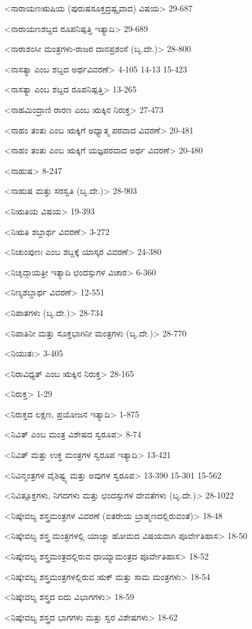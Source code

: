 <ನಾರಾಯಣಋಷಿಯ (ಪುರುಷಸೂಕ್ತದ್ರಷ್ಟೃವಾದ) ವಿಷಯ>
29-687

<ನಾರಾಯಣಶಬ್ದದ ರೂಪನಿಷ್ಪತ್ತಿ ಇತ್ಯಾದಿ>
29-689

<ನಾರಾಶಂಸೀ ಮಂತ್ರಗಳು-ರಾಜರ ದಾನಪ್ರಶಂಸೆ (ಬೃ.ದೇ.)>
28-800

<ನಾಸತ್ಯಾ ಎಂಬ ಶಬ್ದದ ಅರ್ಥವಿವರಣೆ>
4-105
14-13
15-423

<ನಾಸತ್ಯಾ ಎಂಬ ಶಬ್ದದ ರೂಪನಿಷ್ಪತ್ತಿ>
13-265

<ನಾಹಮಿಂದ್ರಾಣಿ ರಾರಣ ಎಂಬ ಋಕ್ಕಿನ ನಿರುಕ್ತ>
27-473

<ನಾಹಂ ತಂತು ಎಂಬ ಋಕ್ಕಿಗೆ ಅಧ್ಯಾತ್ಮ ಪರವಾದ ವಿವರಣೆ>
20-481

<ನಾಹಂ ತಂತು ಎಂಬ ಋಕ್ಕಿಗೆ ಯಜ್ಞಪರವಾದ ಅರ್ಥ ವಿವರಣೆ>
20-480

<ನಾಹುಷ>
8-247

<ನಾಹುಷ ಮತ್ತು ಸರಸ್ವತಿ (ಬೃ.ದೇ.)>
28-903

<ನಿಋತಿಯ ವಿಷಯ>
19-393

<ನಿಋತಿ ಶಬ್ದಾರ್ಥ ವಿವರಣೆ>
3-272

<ನಿಚುಂಪುಣಃ ಎಂಬ ಶಬ್ದಕ್ಕೆ ಯಾಸ್ಕರ ವಿವರಣೆ>
24-380

<ನಿಚೃದ್ಗಾಯತ್ರೀ ಇತ್ಯಾದಿ ಛಂದಸ್ಸುಗಳ ವಿಚಾರ>
6-360

<ನಿಣ್ಯಶಬ್ದಾರ್ಥ ವಿವರಣೆ>
12-551

<ನಿಪಾತಗಳು (ಬೃ.ದೇ.)>
28-734

<ನಿಪಾತಿನೀ ಮತ್ತು ಸೂಕ್ತಭಾಗಿನೀ ಮಂತ್ರಗಳು (ಬೃ.ದೇ.)>
28-770

<ನಿಯುತಃ>
3-405

<ನಿರಾವಿಧ್ಯತ್‍ ಎಂಬ ಋಕ್ಕಿನ ನಿರುಕ್ತ>
28-165

<ನಿರುಕ್ತ>
1-29

<ನಿರುಕ್ತದ ಲಕ್ಷಣ, ಪ್ರಯೋಜನ ಇತ್ಯಾದಿ>
1-875

<ನಿವಿತ್‍ ಎಂಬ ಮಂತ್ರ ವಿಶೇಷದ ಸ್ವರೂಪ>
8-74

<ನಿವಿತ್‍ ಮತ್ತು ಉಕ್ಥ ಮಂತ್ರಗಳ ಸ್ವರೂಪ ಇತ್ಯಾದಿ>
13-421

<ನಿವಿನ್ಮಂತ್ರಗಳ ವೈಶಿಷ್ಟ್ಯ ಮತ್ತು ಅವುಗಳ ಸ್ವರೂಪ>
13-390
15-301
15-562

<ನಿವಿತ್ಸೂಕ್ತಗಳು, ನಿಗದಗಳು ಮತ್ತು ಛಂದಸ್ಸುಗಳ ದೇವತೆಗಳು (ಬೃ.ದೇ.)>
28-1022

<ನಿಷ್ಕೇವಲ್ಯ ಶಸ್ತ್ರಮಂತ್ರಗಳ ವಿವರಣೆ (ಐತರೇಯ ಬ್ರಾಹ್ಮಣದಲ್ಲಿರುವಂತೆ)>
18-48

<ನಿಷ್ಕೇವಲ್ಯ ಶಸ್ತ್ರ ಮಂತ್ರಗಳಲ್ಲಿ ಯಾಜ್ಯಾ ಹೋಮದ ವಿಷಯವಾಗಿ ಪೂರ್ವೇತಿಹಾಸ>
18-50

<ನಿಷ್ಕೇವಲ್ಯ ಶಸ್ತ್ರಮಂತ್ರದಲ್ಲಿರುವ ಧಾಯ್ಯಾಮಂತ್ರದ ಪೂರ್ವೇತಿಹಾಸ>
18-52

<ನಿಷ್ಕೇವಲ್ಯ ಶಸ್ತ್ರಮಂತ್ರಗಳಲ್ಲಿರುವ ಋಕ್‍ ಮತ್ತು ಸಾಮ ಮಂತ್ರಗಳು>
18-54

<ನಿಷ್ಕೇವಲ್ಯ ಶಸ್ತ್ರದ ಐದು ವಿಭಾಗಗಳು>
18-59

<ನಿಷ್ಕೇವಲ್ಯ ಶಸ್ತ್ರದ ಭಾಗಗಳು ಮತ್ತು ಸ್ವರ ವಿಶೇಷಗಳು>
18-62

